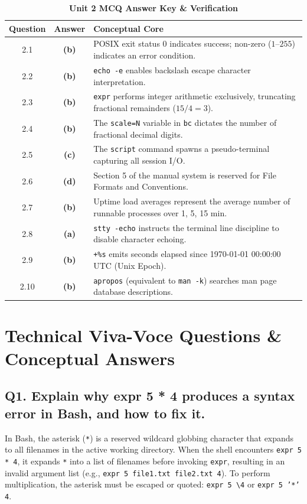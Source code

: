 \begin{table}[htbp]
\centering
\caption{\textbf{Unit 2 MCQ Answer Key \& Verification}}
\begin{tabularx}{0.85\linewidth}{c c X}
\toprule
\textbf{Question} & \textbf{Answer} & \textbf{Conceptual Core} \\
\midrule
2.1 & \textbf{(b)} & POSIX exit status 0 indicates success; non-zero ($1$--$255$) indicates an error condition. \\
2.2 & \textbf{(b)} & \texttt{echo -e} enables backslash escape character interpretation. \\
2.3 & \textbf{(b)} & \texttt{expr} performs integer arithmetic exclusively, truncating fractional remainders ($15/4 = 3$). \\
2.4 & \textbf{(b)} & The \texttt{scale=N} variable in \texttt{bc} dictates the number of fractional decimal digits. \\
2.5 & \textbf{(c)} & The \texttt{script} command spawns a pseudo-terminal capturing all session I/O. \\
2.6 & \textbf{(d)} & Section 5 of the manual system is reserved for File Formats and Conventions. \\
2.7 & \textbf{(b)} & Uptime load averages represent the average number of runnable processes over 1, 5, 15 min. \\
2.8 & \textbf{(a)} & \texttt{stty -echo} instructs the terminal line discipline to disable character echoing. \\
2.9 & \textbf{(b)} & \texttt{+\%s} emits seconds elapsed since 1970-01-01 00:00:00 UTC (Unix Epoch). \\
2.10 & \textbf{(b)} & \texttt{apropos} (equivalent to \texttt{man -k}) searches man page database descriptions. \\
\bottomrule
\end{tabularx}
\end{table}

\section{Technical Viva-Voce Questions \& Conceptual Answers}

\subsection*{Q1. Explain why expr 5 * 4 produces a syntax error in Bash, and how to fix it.}
\begin{vivasol}
In Bash, the asterisk (\texttt{*}) is a reserved wildcard globbing character that expands to all filenames in the active working directory. When the shell encounters \texttt{expr 5 * 4}, it expands \texttt{*} into a list of filenames before invoking \texttt{expr}, resulting in an invalid argument list (e.g., \texttt{expr 5 file1.txt file2.txt 4}). To perform multiplication, the asterisk must be escaped or quoted: \texttt{expr 5 \textbackslash* 4} or \texttt{expr 5 '*' 4}.
\end{vivasol}


